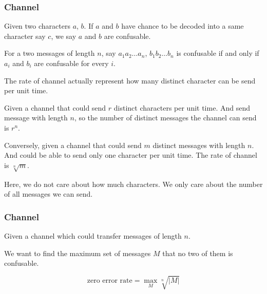       \begin{frame}
            \frametitle{Channel}
            \begin{definition}[confusable]
                  Given two characters $a$, $b$. If $a$ and $b$ have chance to be decoded into a same character say $c$, we say $a$ and $b$ are confusable.

                  For a two messages of length $n$, say $a_{1}a_{2}\dots a_{n}$, $b_{1}b_{2}\dots b_{n}$ is confusable if and only if $a_{i}$ and $b_{i}$ are confusable for every $i$.
            \end{definition}
            \pause
            \begin{definition}
                  The rate of channel actually represent how many distinct character can be send per unit time.

                  Given a channel that could send $r$ distinct characters per unit time. And send message with length $n$, so the number of distinct messages the channel can send is $r^{n}$.

                  \pause

                  Conversely, given a channel that could send $m$ distinct messages with length $n$.
                  And could be able to send only one character per unit time.
                  The rate of channel is $\sqrt[n]{m}$.

                  Here, we do not care about how much characters. We only care about the number of all messages we can send.
                  
            \end{definition}
      \end{frame}

      \begin{frame}
            \frametitle{Channel}
            \begin{definition}
                  Given a channel which could transfer messages of length $n$.

                  We want to find the maximum set of messages $M$ that no two of them is confusable.

                  \begin{equation}
                        \text{zero error rate} = \max_{M} \sqrt[n]{|M|}
                  \end{equation}
            \end{definition}
      \end{frame}

